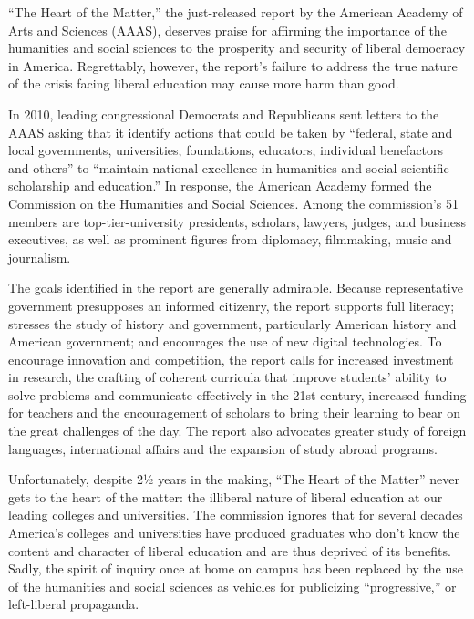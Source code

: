 ``The Heart of the Matter,'' the just-released report by the American
Academy of Arts and Sciences (AAAS), deserves praise for affirming the
importance of the humanities and social sciences to the prosperity and
security of liberal democracy in America. Regrettably, however, the
report's failure to address the true nature of the crisis facing liberal
education may cause more harm than good.

In 2010, leading congressional Democrats and Republicans sent
letters to the AAAS asking that it identify actions that could be taken
by ``federal, state and local governments, universities, foundations,
educators, individual benefactors and others'' to ``maintain national
excellence in humanities and social scientific scholarship and
education.'' In response, the American Academy formed the Commission on
the Humanities and Social Sciences. Among the commission's 51 members
are top-tier-university presidents, scholars, lawyers, judges, and
business executives, as well as prominent figures from diplomacy,
filmmaking, music and journalism.

The goals identified in the report are generally admirable. Because
representative government presupposes an informed citizenry, the report
supports full literacy; stresses the study of history and government,
particularly American history and American government; and encourages
the use of new digital technologies. To encourage innovation and
competition, the report calls for increased investment in research, the
crafting of coherent curricula that improve students' ability to solve
problems and communicate effectively in the 21st century, increased
funding for teachers and the encouragement of scholars to bring their
learning to bear on the great challenges of the day. The report also
advocates greater study of foreign languages, international affairs and
the expansion of study abroad programs.

Unfortunately, despite 2½ years in the making, ``The Heart of the
Matter'' never gets to the heart of the matter: the illiberal nature of
liberal education at our leading colleges and universities. The
commission ignores that for several decades America's colleges and
universities have produced graduates who don't know the content and
character of liberal education and are thus deprived of its benefits.
Sadly, the spirit of inquiry once at home on campus has been replaced by
the use of the humanities and social sciences as vehicles for
publicizing ``progressive,'' or left-liberal propaganda.

